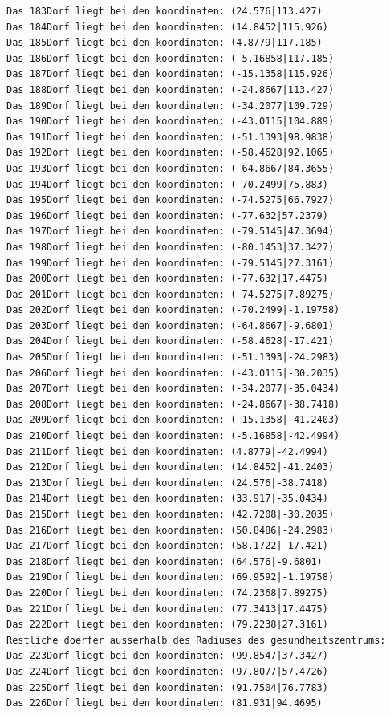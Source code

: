 \documentclass{article}
\begin{document}
\begin{verbatim}
Das 183Dorf liegt bei den koordinaten: (24.576|113.427)
Das 184Dorf liegt bei den koordinaten: (14.8452|115.926)
Das 185Dorf liegt bei den koordinaten: (4.8779|117.185)
Das 186Dorf liegt bei den koordinaten: (-5.16858|117.185)
Das 187Dorf liegt bei den koordinaten: (-15.1358|115.926)
Das 188Dorf liegt bei den koordinaten: (-24.8667|113.427)
Das 189Dorf liegt bei den koordinaten: (-34.2077|109.729)
Das 190Dorf liegt bei den koordinaten: (-43.0115|104.889)
Das 191Dorf liegt bei den koordinaten: (-51.1393|98.9838)
Das 192Dorf liegt bei den koordinaten: (-58.4628|92.1065)
Das 193Dorf liegt bei den koordinaten: (-64.8667|84.3655)
Das 194Dorf liegt bei den koordinaten: (-70.2499|75.883)
Das 195Dorf liegt bei den koordinaten: (-74.5275|66.7927)
Das 196Dorf liegt bei den koordinaten: (-77.632|57.2379)
Das 197Dorf liegt bei den koordinaten: (-79.5145|47.3694)
Das 198Dorf liegt bei den koordinaten: (-80.1453|37.3427)
Das 199Dorf liegt bei den koordinaten: (-79.5145|27.3161)
Das 200Dorf liegt bei den koordinaten: (-77.632|17.4475)
Das 201Dorf liegt bei den koordinaten: (-74.5275|7.89275)
Das 202Dorf liegt bei den koordinaten: (-70.2499|-1.19758)
Das 203Dorf liegt bei den koordinaten: (-64.8667|-9.6801)
Das 204Dorf liegt bei den koordinaten: (-58.4628|-17.421)
Das 205Dorf liegt bei den koordinaten: (-51.1393|-24.2983)
Das 206Dorf liegt bei den koordinaten: (-43.0115|-30.2035)
Das 207Dorf liegt bei den koordinaten: (-34.2077|-35.0434)
Das 208Dorf liegt bei den koordinaten: (-24.8667|-38.7418)
Das 209Dorf liegt bei den koordinaten: (-15.1358|-41.2403)
Das 210Dorf liegt bei den koordinaten: (-5.16858|-42.4994)
Das 211Dorf liegt bei den koordinaten: (4.8779|-42.4994)
Das 212Dorf liegt bei den koordinaten: (14.8452|-41.2403)
Das 213Dorf liegt bei den koordinaten: (24.576|-38.7418)
Das 214Dorf liegt bei den koordinaten: (33.917|-35.0434)
Das 215Dorf liegt bei den koordinaten: (42.7208|-30.2035)
Das 216Dorf liegt bei den koordinaten: (50.8486|-24.2983)
Das 217Dorf liegt bei den koordinaten: (58.1722|-17.421)
Das 218Dorf liegt bei den koordinaten: (64.576|-9.6801)
Das 219Dorf liegt bei den koordinaten: (69.9592|-1.19758)
Das 220Dorf liegt bei den koordinaten: (74.2368|7.89275)
Das 221Dorf liegt bei den koordinaten: (77.3413|17.4475)
Das 222Dorf liegt bei den koordinaten: (79.2238|27.3161)
Restliche doerfer ausserhalb des Radiuses des gesundheitszentrums: 
Das 223Dorf liegt bei den koordinaten: (99.8547|37.3427)
Das 224Dorf liegt bei den koordinaten: (97.8077|57.4726)
Das 225Dorf liegt bei den koordinaten: (91.7504|76.7783)
Das 226Dorf liegt bei den koordinaten: (81.931|94.4695)

\end{verbatim}
\end{document}
